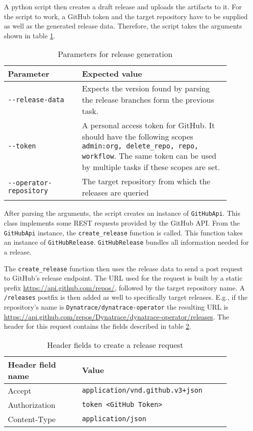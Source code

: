 A python script then creates a draft release and uploads the artifacts to it.
For the script to work, a GitHub token and the target repository have to be supplied as well as the generated release data.
Therefore, the script takes the arguments shown in table \ref{tab:parameters-for-release-generation}.

\begin{table}[H]
    \centering
    \caption{Parameters for release generation}
    \label{tab:parameters-for-release-generation}
    \begin{tabular}{p{0.3\linewidth}|p{0.6\linewidth}}
        Parameter & Expected value \\
        \hline
        \verb|--release-data| & Expects the version found by parsing the release branches form the previous task. \\
        \verb|--token| & A personal access token for GitHub.
            It should have the following scopes \verb|admin:org, delete_repo, repo, workflow|.
            The same token can be used by multiple tasks if these scopes are set. \\
        \verb|--operator-repository| & The target repository from which the releases are queried \\
    \end{tabular}
\end{table}

After parsing the arguments, the script creates an instance of \verb|GitHubApi|.
This class implements some REST requests provided by the GitHub API.
From the \verb|GitHubApi| instance, the \verb|create_release| function is called.
This function takes an instance of \verb|GitHubRelease|.
\verb|GitHubRelease| bundles all information needed for a release.

The \verb|create_release| function then uses the release data to send a post request to GitHub's release endpoint.
The URL used for the request is built by a static prefix \url{https://api.github.com/repos/}, followed by the target repository name.
A \verb|/releases| postfix is then added as well to specifically target releases.
E.g., if the repository's name is \verb|Dynatrace/dynatrace-operator| the resulting URL is \url{https://api.github.com/repos/Dynatrace/dynatrace-operator/releases}.
The header for this request contains the fields described in table \ref{tab:header-fields-to-create-a-release-request}.

\begin{table}[H]
    \centering
    \caption{Header fields to create a release request}
    \label{tab:header-fields-to-create-a-release-request}
    \begin{tabular}{p{0.3\linewidth}|p{0.6\linewidth}}
        Header field name & Value \\
        \hline
        Accept & \verb|application/vnd.github.v3+json|  \\
        Authorization & \verb|token <GitHub Token>| \\
        Content-Type & \verb|application/json| \\
    \end{tabular}
\end{table}

